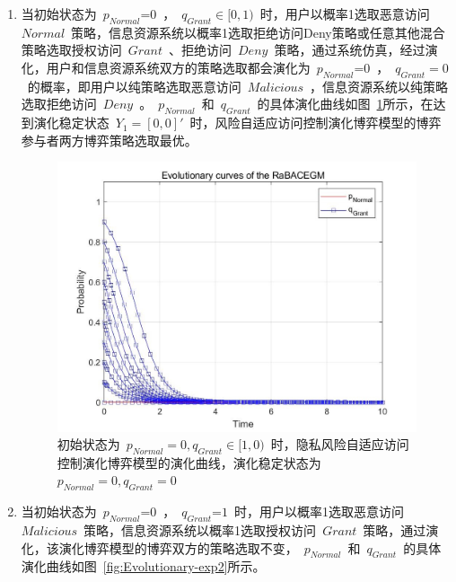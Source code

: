 \begin{enumerate}
 	\item 当初始状态为~${{p}_{Normal}}\text{=0}$~，~${{q}_{Grant}}\in [0,1)$~时，用户以概率1选取恶意访问~$Normal$~策略，信息资源系统以概率1选取拒绝访问Deny策略或任意其他混合策略选取授权访问~$Grant$~、拒绝访问~$Deny$~策略，通过系统仿真，经过演化，用户和信息资源系统双方的策略选取都会演化为~${{p}_{Normal}}\text{=0}$~，~${{q}_{Grant}}=0$~的概率，即用户以纯策略选取恶意访问~$Malicious$~，信息资源系统以纯策略选取拒绝访问~$Deny$~。~${{p}_{Normal}}$~和~${{q}_{Grant}}$~的具体演化曲线如图~\ref{fig:Evolutionary-exp1}所示，在达到演化稳定状态~${{Y}_{1}}=[0,0]'$~时，风险自适应访问控制演化博弈模型的博弈参与者两方博弈策略选取最优。
 	
 	 \begin{figure}[htbp]
 		\centering
 		\includegraphics[width=0.8\linewidth]{./figures/Evolutionary-exp1.jpg}
 		\centering
 		\caption{初始状态为~$p_{Normal}=0,q_{Grant}\in [1,0)$~时，隐私风险自适应访问控制演化博弈模型的演化曲线，演化稳定状态为~$p_{Normal}=0, q_{Grant}=0$~}\label{fig:Evolutionary-exp1}
 	\end{figure}
 
 	\item 当初始状态为~${{p}_{Normal}}\text{=0}$~，~${{q}_{Grant}}\text{=}1$~时，用户以概率1选取恶意访问~$Malicious$~策略，信息资源系统以概率1选取授权访问~$Grant$~策略，通过演化，该演化博弈模型的博弈双方的策略选取不变，~${{p}_{Normal}}$~和~${{q}_{Grant}}$~的具体演化曲线如图~\ref{fig:Evolutionary-exp2}所示。
 	

\end{enumerate}
